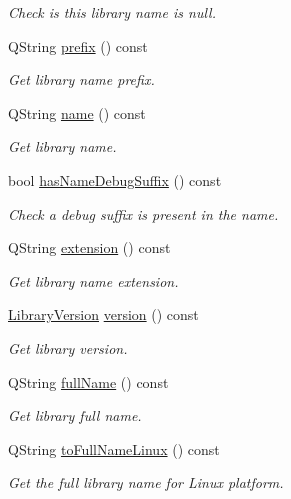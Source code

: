 \begin{DoxyCompactItemize}
\begin{DoxyCompactList}\small\item\em Check is this library name is null. \end{DoxyCompactList}\item 
Q\+String \hyperlink{class_mdt_1_1_deploy_utils_1_1_library_name_a97bcd2eb9df2f836ade7db5b1812e808}{prefix} () const 
\begin{DoxyCompactList}\small\item\em Get library name prefix. \end{DoxyCompactList}\item 
Q\+String \hyperlink{class_mdt_1_1_deploy_utils_1_1_library_name_a4b379ec428e7819d9f164f25a472b6b1}{name} () const 
\begin{DoxyCompactList}\small\item\em Get library name. \end{DoxyCompactList}\item 
bool \hyperlink{class_mdt_1_1_deploy_utils_1_1_library_name_aa25817d91f88d5863046948b81440163}{has\+Name\+Debug\+Suffix} () const 
\begin{DoxyCompactList}\small\item\em Check a debug suffix is present in the name. \end{DoxyCompactList}\item 
Q\+String \hyperlink{class_mdt_1_1_deploy_utils_1_1_library_name_a34442b11c8cd11ceb8f6903d473dcd2d}{extension} () const 
\begin{DoxyCompactList}\small\item\em Get library name extension. \end{DoxyCompactList}\item 
\hyperlink{class_mdt_1_1_deploy_utils_1_1_library_version}{Library\+Version} \hyperlink{class_mdt_1_1_deploy_utils_1_1_library_name_a59e3df9a9af9a081a9b09eec7292bb80}{version} () const \hypertarget{class_mdt_1_1_deploy_utils_1_1_library_name_a59e3df9a9af9a081a9b09eec7292bb80}{}\label{class_mdt_1_1_deploy_utils_1_1_library_name_a59e3df9a9af9a081a9b09eec7292bb80}

\begin{DoxyCompactList}\small\item\em Get library version. \end{DoxyCompactList}\item 
Q\+String \hyperlink{class_mdt_1_1_deploy_utils_1_1_library_name_a2ca0dd90765abc0bd7082bc3f64da1c7}{full\+Name} () const 
\begin{DoxyCompactList}\small\item\em Get library full name. \end{DoxyCompactList}\item 
Q\+String \hyperlink{class_mdt_1_1_deploy_utils_1_1_library_name_a53890f4faa14e43f3b38fb9aabae88c9}{to\+Full\+Name\+Linux} () const 
\begin{DoxyCompactList}\small\item\em Get the full library name for Linux platform. \end{DoxyCompactList}\end{DoxyCompactItemize}
